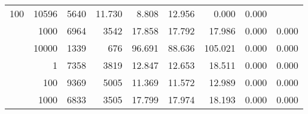 \begin{table}
\begin{tabular}{rrrrrrrrr}
					\multirow{ 1 }{*}{ 100 } &
					
						
							    
							     10596  & 5640  
	                           & 11.730 & 8.808 & 12.956
	                           & 0.000 & 0.000  \\
	                
	            
					 &  
					 
					\multirow{ 1 }{*}{ 1000 } &
					
						
							    
							     6964  & 3542  
	                           & 17.858 & 17.792 & 17.986
	                           & 0.000 & 0.000  \\
	                
	            
					 &  
					 
					\multirow{ 1 }{*}{ 10000 } &
					
						
							    
							     1339  & 676  
	                           & 96.691 & 88.636 & 105.021
	                           & 0.000 & 0.000  \\
	                
	            
	        
				\noalign{\smallskip}\hline
				\multirow{ 4 }{*}{ 250000 } &
				
					
					 
					\multirow{ 1 }{*}{ 1 } &
					
						
							    
							     7358  & 3819  
	                           & 12.847 & 12.653 & 18.511
	                           & 0.000 & 0.000  \\
	                
	            
					 &  
					 
					\multirow{ 1 }{*}{ 100 } &
					
						
							    
							     9369  & 5005  
	                           & 11.369 & 11.572 & 12.989
	                           & 0.000 & 0.000  \\
	                
	            
					 &  
					 
					\multirow{ 1 }{*}{ 1000 } &
					
						
							    
							     6833  & 3505  
	                           & 17.799 & 17.974 & 18.193
	                           & 0.000 & 0.000  \\
	                

\end{tabular}
\end{table}
